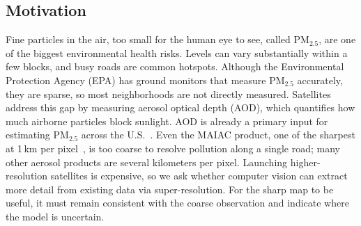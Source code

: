 \documentclass[conference]{IEEEtran}
\begin{document}
\subsection{Motivation}
Fine particles in the air, too small for the human eye to see, called PM$_{2.5}$, are one of the biggest environmental health risks. Levels can vary substantially within a few blocks, and busy roads are common hotspots. Although the Environmental Protection Agency (EPA) has ground monitors that measure PM$_{2.5}$ accurately, they are sparse, so most neighborhoods are not directly measured. Satellites address this gap by measuring aerosol optical depth (AOD), which quantifies how much airborne particles block sunlight. AOD is already a primary input for estimating PM$_{2.5}$ across the U.S.~\cite{di2019ensemble}. Even the MAIAC product, one of the sharpest at 1\,km per pixel~\cite{lyapustin2018maiac}, is too coarse to resolve pollution along a single road; many other aerosol products are several kilometers per pixel. Launching higher-resolution satellites is expensive, so we ask whether computer vision can extract more detail from existing data via super-resolution. For the sharp map to be useful, it must remain consistent with the coarse observation and indicate where the model is uncertain.
\end{document}
